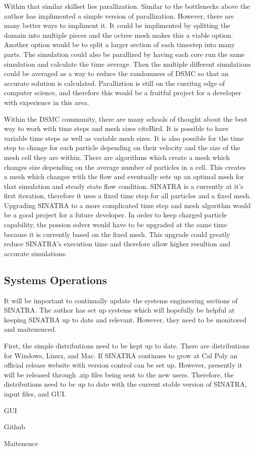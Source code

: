 \indent Within that similar skillset lies parallization. Similar to the bottlenecks above the author has implimented a simple version of parallization. However, there are many better ways to impliment it. It could be implimented by splitting the domain into multiple pieces and the octree mesh makes this a viable option. Another option would be to split a larger section of each timestep into many parts. The simulation could also be parallized by having each core run the same simulation and calculate the time average. Then the multiple different simulations could be averaged as a way to reduce the randomness of DSMC so that an accurate solution is calculated. Paralliztion is still on the curritng edge of computer science, and therefore this would be a fruitful project for a developer with experience in this area. \par

\indent Within the DSMC community, there are many schools of thought about the best way to work with time steps and mesh sizes cite{Bird}. It is possible to have variable time steps as well as variable mesh sizes. It is also possible for the time step to change for each particle depending on their velocity and the size of the mesh cell they are within. There are algorithms which create a mesh which changes size depending on the average number of particles in a cell. This creates a mesh which changes with the flow and eventually sets up an optimal mesh for that simulation and steady state flow condition. SINATRA is a currently at it's first iteration, therefore it uses a fixed time step for all particles and a fixed mesh. Upgrading SINATRA to a more complicated time step and mesh algorithm would be a good project for a future developer. In order to keep charged particle capability, the possion solver would have to be upgraded at the same time because it is currently based on the fixed mesh. This upgrade could greatly reduce SINATRA's execution time and therefore allow higher resultion and accurate simulations. \par

\subsection{Systems Operations}

It will be important to continually update the systems engineering sections of SINATRA. The author has set up systems which will hopefully be helpful at keeping SINATRA up to date and relevant. However, they need to be monitored and maitenenced. \par

\indent First, the simple distributions need to be kept up to date. There are distributions for Windows, Linux, and Mac. If SINATRA continues to grow at Cal Poly an official release website with version control can be set up. However, presently it will be released through .zip files being sent to the new users. Therefore, the distributions need to be up to date with the current stable version of SINATRA, input files, and GUI. 

GUI

Github

Maitenence



